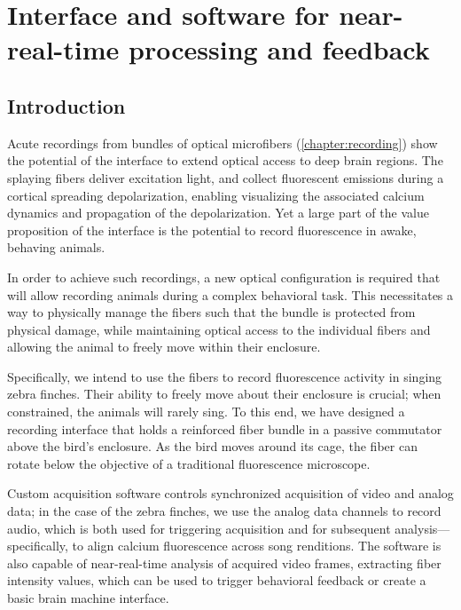 \chapter{Interface and software for near-real-time processing and feedback}
\label{chapter:processing}

\thispagestyle{myheadings}

\graphicspath{{6_Processing/Figures/}}

\section{Introduction}

Acute recordings from bundles of optical microfibers 
(\cref{chapter:recording}) show the potential of the 
interface to extend optical access to deep brain 
regions. The splaying fibers deliver excitation light,
and collect fluorescent emissions during a cortical 
spreading depolarization, enabling visualizing the 
associated calcium dynamics and propagation of the 
depolarization. Yet a large part of the value proposition 
of the interface is the potential to record fluorescence 
in awake, behaving animals.

In order to achieve such recordings, a new optical 
configuration is required that will allow recording 
animals during a complex behavioral task. This necessitates 
a way to physically manage the fibers such that the bundle is 
protected from physical damage, while maintaining optical 
access to the individual fibers and allowing the animal 
to freely move within their enclosure.

Specifically, we intend to use the fibers to record 
fluorescence activity in singing zebra finches. 
Their ability to freely move about their enclosure 
is crucial; when constrained, the animals will rarely 
sing. To this end, we have designed a recording interface 
that holds a reinforced fiber bundle in a passive 
commutator above the bird's enclosure. As the bird moves 
around its cage, the fiber can rotate below the objective 
of a traditional fluorescence microscope. 

Custom acquisition software controls synchronized acquisition of 
video and analog data; in the case of the zebra finches, we 
use the analog data channels to record audio, 
which is both used for triggering acquisition and for subsequent 
analysis---specifically, to align calcium fluorescence across
song renditions. The software is also capable of near-real-time 
analysis of acquired video frames, extracting fiber 
intensity values, which can be used to trigger 
behavioral feedback or create a basic brain machine interface.

